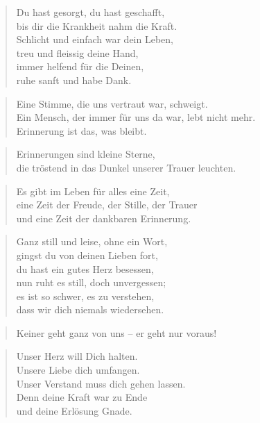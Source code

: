 \documentclass[ngerman,a4paper,11pt]{scrreprt}
\begin{document}
\begin{verse}
Du hast gesorgt, du hast geschafft, \\
bis dir die Krankheit nahm die Kraft. \\
Schlicht und einfach war dein Leben, \\
treu und fleissig deine Hand, \\
immer helfend für die Deinen, \\
ruhe sanft und habe Dank. \\
\end{verse}

\begin{verse}
Eine Stimme, die uns vertraut war, schweigt. \\
Ein Mensch, der immer für uns da war, lebt nicht mehr. \\
Erinnerung ist das, was bleibt. \\
\end{verse}

\begin{verse}
Erinnerungen sind kleine Sterne, \\
die tröstend in das Dunkel unserer Trauer leuchten. \\
\end{verse}

\begin{verse}
Es gibt im Leben für alles eine Zeit, \\
eine Zeit der Freude, der Stille, der Trauer \\
und eine Zeit der dankbaren Erinnerung. \\
\end{verse}

\begin{verse}
Ganz still und leise, ohne ein Wort, \\
gingst du von deinen Lieben fort, \\
du hast ein gutes Herz besessen, \\
nun ruht es still, doch unvergessen; \\
es ist so schwer, es zu verstehen, \\
dass wir dich niemals wiedersehen. \\
\end{verse}

\begin{verse}
Keiner geht ganz von uns -- er geht nur voraus! \\
\end{verse}

\begin{verse}
Unser Herz will Dich halten. \\
Unsere Liebe dich umfangen. \\
Unser Verstand muss dich gehen lassen. \\
Denn deine Kraft war zu Ende \\
und deine Erlösung Gnade. \\
\end{verse}
\end{document}
